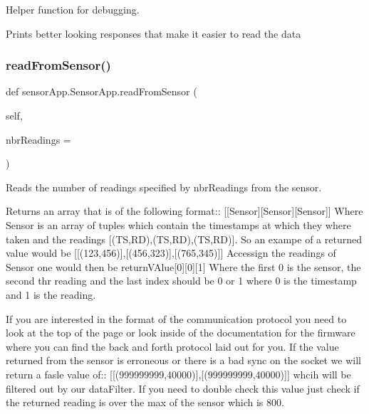 Helper function for debugging. 

Prints better looking responses that make it easier to read the data \mbox{\label{classsensor_app_1_1_sensor_app_a5c008ad5e7412c3e6edb19fd1853c882}} 
\subsubsection{\texorpdfstring{read\+From\+Sensor()}{readFromSensor()}}
{\footnotesize\ttfamily def sensor\+App.\+Sensor\+App.\+read\+From\+Sensor (\begin{DoxyParamCaption}\item[{}]{self,  }\item[{}]{nbr\+Readings = {} }\end{DoxyParamCaption})}



Reads the number of readings specified by nbr\+Readings from the sensor. 

Returns an array that is of the following format\+:\+: \mbox{[}\mbox{[}Sensor\mbox{]}\mbox{[}Sensor\mbox{]}\mbox{[}Sensor\mbox{]}\mbox{]} Where Sensor is an array of tuples which contain the timestamps at which they where taken and the readings \mbox{[}(TS,RD),(TS,RD),(TS,RD)\mbox{]}. So an exampe of a returned value would be \mbox{[}\mbox{[}(123,456)\mbox{]},\mbox{[}(456,323)\mbox{]},\mbox{[}(765,345)\mbox{]}\mbox{]} Accessign the readings of Sensor one would then be return\+V\+Alue\mbox{[}0\mbox{]}\mbox{[}0\mbox{]}\mbox{[}1\mbox{]} Where the first 0 is the sensor, the second thr reading and the last index should be 0 or 1 where 0 is the timestamp and 1 is the reading. \begin{DoxyVerb}   If you are interested in the format of the communication protocol you need to look at the top of the page or look inside of the documentation for the firmware where you can find the back and forth protocol laid out for you. If the value returned from the sensor is erroneous or there is a bad sync on the socket we will return a fasle value of:: [[(999999999,40000)],[(999999999,40000)]] whcih will be filtered out by our dataFilter. If you need to double check this value just check if the returned reading is over the max of the sensor which is 800.
\end{DoxyVerb}



